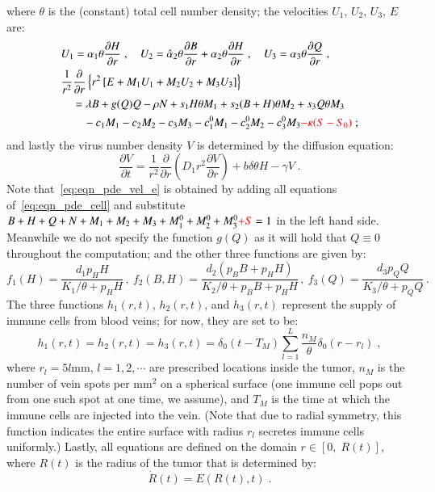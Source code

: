\documentclass[reqno]{amsart}
\theoremstyle{definition}
\theoremstyle{remark}
\numberwithin{equation}{section}
\numberwithin{figure}{section}
\newcommand{\po}[1]{\frac{\partial}{\partial{#1}}}
\newcommand{\pp}[2]{\frac{\partial {#1}}{\partial {#2}}}
\begin{document}
where $\theta$ is the (constant) total cell number density; the velocities $U_1$, $U_2$, $U_3$, $E$ are:
\begin{subequations}\label{eq:eqn_pde_vel}
  \begin{align}
    \label{eq:eqn_pde_vel_u}
    &U_1 = \alpha_1\theta\pp{H}{r}\;,\quad U_2 = \hat{\alpha}_2\theta\pp{B}{r}+\alpha_2\theta\pp{H}{r}\;,\quad U_3 = \alpha_3\theta\pp{Q}{r}\;, \\
    \notag
    &\frac{1}{r^2}\po{r}\left\{r^2\left[E+M_1U_1+M_2U_2+M_3U_3\right]\right\} \\
    \label{eq:eqn_pde_vel_e}
    &\quad = \lambda B + g(Q)Q-\rho N +s_1H\theta M_1+s_2(B+H)\theta M_2+s_3Q\theta M_3 \\
    \notag
    &\qquad -c_1M_1-c_2M_2-c_3M_3-c_1^0M_1-c_2^0M_2-c_3^0M_3{\color{red}-\kappa(S-S_0)}\;;
  \end{align}
\end{subequations}
and lastly the virus number density $V$ is determined by the diffusion equation:
\begin{equation}\label{eq:eqn_pde_virus}
  \pp{V}{t} = \frac{1}{r^2}\po{r}\left(D_1r^2\pp{V}{r}\right) + b\delta\theta H-\gamma V\;.
\end{equation}
Note that~\cref{eq:eqn_pde_vel_e} is obtained by adding all equations of~\cref{eq:eqn_pde_cell} and substitute $B+H+Q+N+M_1+M_2+M_3+M_1^0+M_2^0+M_3^0{\color{red}+S}=1$ in the left hand side.
Meanwhile we do not specify the function $g(Q)$ as it will hold that $Q\equiv0$ throughout the computation; and the other three functions are given by:
\begin{equation}\label{eq:eqn_pde_efun}
  f_1(H) = \frac{d_1p_H H}{K_1/\theta+p_HH}\,,\ 
  f_2(B,H) = \frac{d_2(p_BB+p_HH)}{K_2/\theta+p_BB+p_HH}\,,\ 
  f_3(Q) = \frac{d_3p_QQ}{K_3/\theta+p_QQ}\,.
\end{equation}
{\color{red}
The three functions $h_1(r,t)$, $h_2(r,t)$, and $h_3(r,t)$ represent the supply of immune cells from blood veins; for now, they are set to be:
\begin{equation}\label{eq:eqn_pde_supply}
  h_1(r,t) = h_2(r,t) = h_3(r,t) = \delta_0(t-T_M)\sum_{l=1}^L\frac{n_M}{\theta}\delta_0(r-r_l)\;,
\end{equation}
where $r_l=5l\textrm{mm}$, $l=1,2,\cdots$ are prescribed locations inside the tumor, $n_M$ is the number of vein spots per $\textrm{mm}^2$ on a spherical surface (one immune cell pops out from one such spot at one time, we assume), 
and $T_M$ is the time at which the immune cells are injected into the vein.
(Note that due to radial symmetry, this function indicates the entire surface with radius $r_l$ secretes immune cells uniformly.)
}
Lastly, all equations are defined on the domain $r\in[0,\;R(t)]$, where $R(t)$ is the radius of the tumor that is determined by:
\begin{equation}\label{eq:eqn_pde_rad}
  \dot{R}(t) = E(R(t),t)\;.
\end{equation}
\end{document}
